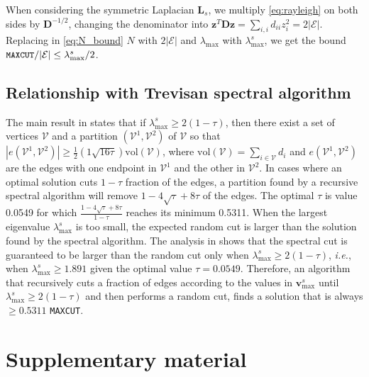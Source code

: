 \documentclass[journal]{IEEEtran}
\def\z{{\mathbf z}}
\def\v{{\mathbf v}}
\def\L{{\mathbf L}}
\def\D{{\mathbf D}}
\newcommand{\maxcut}{\texttt{\small{MAXCUT}}}
\begin{document}
When considering the symmetric Laplacian $\L_s$, we multiply \eqref{eq:rayleigh} on both sides by $\D^{-1/2}$, changing the denominator into $\z^T\D\z = \sum_{i,i}d_{ii} z_i^2 = 2|\mathcal{E}|$.
Replacing in \eqref{eq:N_bound} $N$ with $2|\mathcal{E}|$ and $\lambda_\text{max}$ with $\lambda^s_\text{max}$, we get the bound $\maxcut{} / |\mathcal{E}| \leq \lambda^s_\text{max} / 2$.

\subsection{Relationship with Trevisan \cite{trevisan2012max} spectral algorithm}
\label{sec:trevisan}
The main result in \cite{trevisan2012max} states that if $\lambda^s_\text{max} \geq 2(1-\tau)$, then there exist a set of vertices $\mathcal{V}$ and a partition $(\mathcal{V}^1, \mathcal{V}^2)$ of $\mathcal{V}$ so that $|e(\mathcal{V}^1, \mathcal{V}^2)| \geq \frac{1}{2} (1 \sqrt{16 \tau})\text{vol}(\mathcal{V})$, where $\text{vol}(\mathcal{V}) = \sum_{i \in \mathcal{V}} d_i$ and $e(\mathcal{V}^1, \mathcal{V}^2)$ are the edges with one endpoint in $\mathcal{V}^1$ and the other in $\mathcal{V}^2$. 
In cases where an optimal solution cuts $1-\tau$ fraction of the edges, a partition found by a recursive spectral algorithm will remove $1 - 4\sqrt{\tau} +8\tau$ of the edges. 
The optimal $\tau$ is value 0.0549 for which $\frac{1 - 4\sqrt{\tau} +8\tau}{1-\tau}$ reaches its minimum 0.5311. 
When the largest eigenvalue $\lambda^s_\text{max}$ is too small, the expected random cut is larger than the solution found by the spectral algorithm.
The analysis in \cite{trevisan2012max} shows that the spectral cut is guaranteed to be larger than the random cut only when $\lambda^s_\text{max} \geq 2(1-\tau)$, \textit{i.e.}, when $\lambda^s_\text{max} \geq 1.891$ given the optimal value $\tau = 0.0549$.
Therefore, an algorithm that recursively cuts a fraction of edges according to the values in $\v^s_\text{max}$ until $\lambda^s_\text{max} \geq 2(1-\tau)$ and then performs a random cut, finds a solution that is always $\geq0.5311$ \maxcut{}. 





\clearpage

\onecolumn



\section*{Supplementary material}
\setcounter{subsection}{0}
\end{document}
